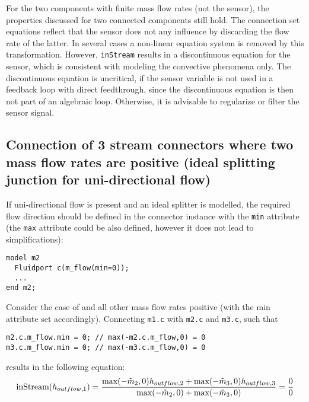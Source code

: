 For the two components with finite mass flow rates (not the sensor), the
properties discussed for two connected components still hold. The
connection set equations reflect that the sensor does not any influence
by discarding the flow rate of the latter. In several cases a non-linear
equation system is removed by this transformation. However, \lstinline!inStream!
results in a discontinuous equation for the sensor, which is consistent
with modeling the convective phenomena only. The discontinuous equation
is uncritical, if the sensor variable is not used in a feedback loop
with direct feedthrough, since the discontinuous equation is then not
part of an algebraic loop. Otherwise, it is advisable to regularize or
filter the sensor signal.

\subsection{Connection of 3 stream connectors where two mass flow rates are positive (ideal splitting junction for uni-directional flow)}\label{connection-of-3-stream-connectors-where-two-mass-flow-rates-are-positive-ideal-splitting-junction-for-uni-directional-flow}

If uni-directional flow is present and an ideal splitter is modelled,
the required flow direction should be defined in the connector instance
with the \lstinline!min! attribute (the \lstinline!max! attribute could be also defined,
however it does not lead to simplifications):
\begin{lstlisting}[language=modelica]
model m2
  Fluidport c(m_flow(min=0));
  ...
end m2;
\end{lstlisting}

Consider the case of and all other mass flow rates positive (with the
min attribute set accordingly). Connecting \lstinline!m1.c! with \lstinline!m2.c! and \lstinline!m3.c!, such
that
\begin{lstlisting}[language=modelica]
m2.c.m_flow.min = 0; // max(-m2.c.m_flow,0) = 0
m3.c.m_flow.min = 0; // max(-m3.c.m_flow,0) = 0
\end{lstlisting}
results in the following equation:
\begin{equation*}
\text{\lstinline!inStream!}(h_{outflow,1})=\frac{\text{max}(-\tilde{m}_2,0)h_{outflow,2}+\text{max}(-\tilde{m}_3,0)h_{outflow,3}}{\text{max}(-\tilde{m}_2,0)+\text{max}(-\tilde{m}_3,0)}=\frac{0}{0}
\end{equation*}

